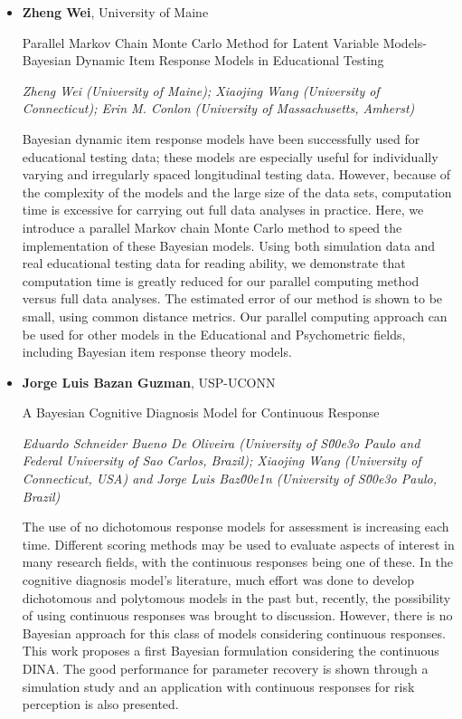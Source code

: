 \begin{itemize}
\item \textbf{Zheng Wei}, University of Maine

Parallel Markov Chain Monte Carlo Method for Latent Variable Models-Bayesian Dynamic Item Response Models in Educational Testing

\emph{\footnotesize Zheng Wei (University of Maine); Xiaojing Wang (University of Connecticut); Erin M. Conlon (University of Massachusetts, Amherst)}

Bayesian dynamic item response models have been successfully used for educational testing data; these models are especially useful for individually varying and irregularly spaced longitudinal testing data. However, because of the complexity of the models and the large size of the data sets, computation time is excessive for carrying out full data analyses in practice. Here, we introduce a parallel Markov chain Monte Carlo method to speed the implementation of these Bayesian models. Using both simulation data and real educational testing data for reading ability, we demonstrate that computation time is greatly reduced for our parallel computing method versus full data analyses. The estimated error of our method is shown to be small, using common distance metrics. Our parallel computing approach can be used for other models in the Educational and Psychometric fields, including Bayesian item response theory models.

\item \textbf{Jorge Luis Bazan Guzman}, USP-UCONN

A Bayesian Cognitive Diagnosis Model for Continuous Response

\emph{\footnotesize Eduardo Schneider Bueno De Oliveira (University of S\u00e3o Paulo and Federal University of Sao Carlos, Brazil); Xiaojing Wang (University of Connecticut, USA) and  Jorge Luis Baz\u00e1n (University of S\u00e3o Paulo, Brazil)}

The use of no dichotomous response models for assessment is increasing each time. Different scoring methods may be used to evaluate aspects of interest in many research fields, with the continuous responses being one of these. In the cognitive diagnosis model’s literature, much effort was done to develop dichotomous and polytomous models in the past but, recently, the possibility of using continuous responses was brought to discussion. However, there is no Bayesian approach for this class of models considering continuous responses. This work proposes a first Bayesian formulation considering the continuous DINA. The good performance for parameter recovery is shown through a simulation study and an application with continuous responses for risk perception is also presented.


\end{itemize}
